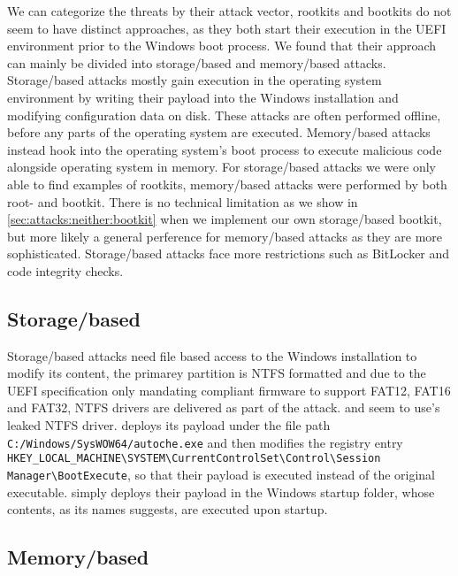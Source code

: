 We can categorize the threats by their attack vector, rootkits and bootkits do not seem to have distinct approaches, as they both start their execution in the \ac{UEFI} environment prior to the Windows boot process.
We found that their approach can mainly be divided into storage\-/based and memory\-/based attacks.
Storage\-/based attacks mostly gain execution in the operating system  environment by writing their payload into the Windows installation and modifying configuration data on disk. These attacks are often performed offline, before any parts of the operating system are executed. Memory\-/based attacks instead hook into the operating system's boot process to execute malicious code alongside operating system in memory. For storage\-/based attacks we were only able to find examples of rootkits\cite{vector-edk,mosaicregressor,lojax}, memory\-/based attacks were performed by both root- and bootkit\cite{dreamboot,efiguard,especter,finspy,moonbounce,cosmicstrand}.
There is no technical limitation as we show in \autoref{sec:attacks:neither:bootkit} when we implement our own storage\-/based bootkit, but more likely a general perference for memory\-/based attacks as they are more sophisticated. Storage\-/based attacks face more restrictions such as BitLocker and code integrity checks.

\subsection{Storage\-/based}

Storage\-/based attacks need file based access to the Windows installation to modify its content, the primarey partition is \ac{NTFS} formatted and due to the \ac{UEFI} specification only mandating compliant firmware to support \ac{FAT}12, \ac{FAT}16 and \ac{FAT}32\cite[13.3.1.1]{uefi-spec}, \ac{NTFS} drivers are delivered as part of the attack.\cite{mosaicregressor} and\cite{lojax} seem to use\cite{vector-edk}'s leaked \ac{NTFS} driver.\cite{lojax} deploys its payload under the file path \lstinline{C:/Windows/SysWOW64/autoche.exe} and then modifies the registry entry \lstinline{HKEY_LOCAL_MACHINE\SYSTEM\CurrentControlSet\Control\Session Manager\BootExecute}, so that their payload is executed instead of the original executable.\cite{mosaicregressor} simply deploys their payload in the Windows startup folder, whose contents, as its names suggests, are executed upon startup.

\subsection{Memory\-/based}

